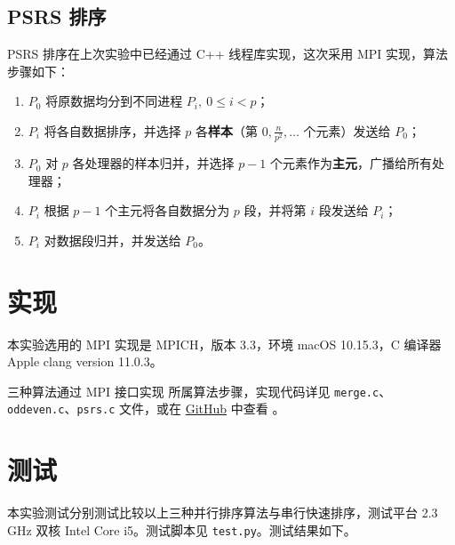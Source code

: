 \documentclass{zjureport-zh}
\begin{document}
\subsection{PSRS 排序}
\par PSRS 排序在上次实验中已经通过 C++ 线程库实现，这次采用 MPI 实现，算法步骤如下：
\begin{enumerate}[itemindent=2em,label=\roman*)]
	\item $P_0$ 将原数据均分到不同进程 $P_i,\ 0 \leq i < p$；
	\item $P_i$ 将各自数据排序，并选择 $p$ 各\textbf{样本}（第 $0, \frac{n}{p^2}, \dots$ 个元素）发送给 $P_0$；
	\item $P_0$ 对 $p$ 各处理器的样本归并，并选择 $p-1$ 个元素作为\textbf{主元}，广播给所有处理器；
	\item $P_i$ 根据 $p-1$ 个主元将各自数据分为 $p$ 段，并将第 $i$ 段发送给 $P_i$；
	\item $P_i$ 对数据段归并，并发送给 $P_0$。
\end{enumerate}


\section{实现}
\par 本实验选用的 MPI 实现是 MPICH，版本 3.3，环境 macOS 10.15.3，C 编译器 Apple clang version 11.0.3。
\par 三种算法通过 MPI 接口实现 所属算法步骤，实现代码详见 \texttt{merge.c}、\texttt{oddeven.c}、\texttt{psrs.c} 文件，或在 \href{https://github.com/zhuo34/mpi-sort}{GitHub} 中查看 。


\section{测试}
\par 本实验测试分别测试比较以上三种并行排序算法与串行快速排序，测试平台 2.3 GHz 双核 Intel Core i5。测试脚本见 \texttt{test.py}。测试结果如下。
\end{document}

